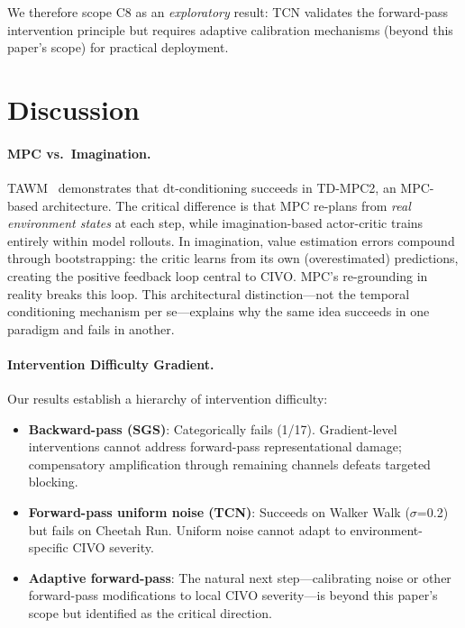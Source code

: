 \documentclass{article}
\newcommand{\dt}{\mathrm{dt}}
\begin{document}
We therefore scope C8 as an \emph{exploratory} result: TCN validates the forward-pass intervention principle but requires adaptive calibration mechanisms (beyond this paper's scope) for practical deployment.

\section{Discussion}

\paragraph{MPC vs.\ Imagination.}
TAWM~\cite{nhu2025tawm} demonstrates that $\dt$-conditioning succeeds in TD-MPC2, an MPC-based architecture.
The critical difference is that MPC re-plans from \emph{real environment states} at each step, while imagination-based actor-critic trains entirely within model rollouts.
In imagination, value estimation errors compound through bootstrapping: the critic learns from its own (overestimated) predictions, creating the positive feedback loop central to CIVO.
MPC's re-grounding in reality breaks this loop.
This architectural distinction---not the temporal conditioning mechanism per se---explains why the same idea succeeds in one paradigm and fails in another.

\paragraph{Intervention Difficulty Gradient.}
Our results establish a hierarchy of intervention difficulty:
\begin{itemize}[leftmargin=*,itemsep=1pt]
\item \textbf{Backward-pass (SGS)}: Categorically fails (1/17). Gradient-level interventions cannot address forward-pass representational damage; compensatory amplification through remaining channels defeats targeted blocking.
\item \textbf{Forward-pass uniform noise (TCN)}: Succeeds on Walker Walk ($\sigma$=0.2) but fails on Cheetah Run. Uniform noise cannot adapt to environment-specific CIVO severity.
\item \textbf{Adaptive forward-pass}: The natural next step---calibrating noise or other forward-pass modifications to local CIVO severity---is beyond this paper's scope but identified as the critical direction.
\end{itemize}
\end{document}
